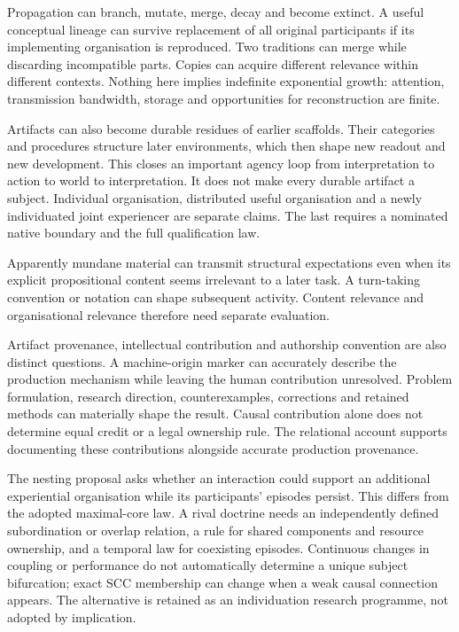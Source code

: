 \documentclass[
  11pt,
  a4paper,
]{article}
\begin{document}
Propagation can branch, mutate, merge, decay and become extinct. A
useful conceptual lineage can survive replacement of all original
participants if its implementing organisation is reproduced. Two
traditions can merge while discarding incompatible parts. Copies can
acquire different relevance within different contexts. Nothing here
implies indefinite exponential growth: attention, transmission
bandwidth, storage and opportunities for reconstruction are finite.

Artifacts can also become durable residues of earlier scaffolds. Their
categories and procedures structure later environments, which then shape
new readout and new development. This closes an important agency loop
from interpretation to action to world to interpretation. It does not
make every durable artifact a subject. Individual organisation,
distributed useful organisation and a newly individuated joint
experiencer are separate claims. The last requires a nominated native
boundary and the full qualification law.

Apparently mundane material can transmit structural expectations even
when its explicit propositional content seems irrelevant to a later
task. A turn-taking convention or notation can shape subsequent
activity. Content relevance and organisational relevance therefore need
separate evaluation.

Artifact provenance, intellectual contribution and authorship convention
are also distinct questions. A machine-origin marker can accurately
describe the production mechanism while leaving the human contribution
unresolved. Problem formulation, research direction, counterexamples,
corrections and retained methods can materially shape the result. Causal
contribution alone does not determine equal credit or a legal ownership
rule. The relational account supports documenting these contributions
alongside accurate production provenance.

The nesting proposal asks whether an interaction could support an
additional experiential organisation while its participants' episodes
persist. This differs from the adopted maximal-core law. A rival
doctrine needs an independently defined subordination or overlap
relation, a rule for shared components and resource ownership, and a
temporal law for coexisting episodes. Continuous changes in coupling or
performance do not automatically determine a unique subject bifurcation;
exact SCC membership can change when a weak causal connection appears.
The alternative is retained as an individuation research programme, not
adopted by implication.
\end{document}
